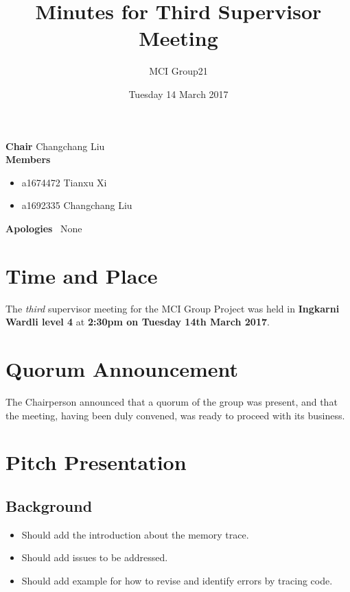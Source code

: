 \documentclass[11pt, a4paper]{article}
\begin{document}
\title{Minutes for Third Supervisor Meeting}
\author{MCI Group21}
\date{Tuesday 14 March 2017}
\maketitle

\vspace*{15pt}

\begin{center}
\begin{flushleft}
  \textbf{Chair}      \qquad Changchang Liu\\
  \textbf{Members}
  \begin {itemize}
  		\item a1674472 Tianxu Xi
		\item a1692335 Changchang Liu

  \end{itemize} 
  \textbf{Apologies}  \ None\\
\end{flushleft}
\end{center}




\vspace*{10pt}

\section{Time and Place}
The \emph{third} supervisor meeting for the MCI Group Project was held in \textbf{Ingkarni Wardli level 4} at \textbf{2:30pm on Tuesday 14th March 2017}.
 
\section{Quorum Announcement}
The Chairperson announced that a quorum of the group was present, and that the meeting, having been duly convened, was ready to proceed with its business.



\section{Pitch Presentation}

\subsection{Background}
\begin{itemize}
\item Should add the introduction about the memory trace.
\item Should add issues to be addressed.
\item Should add example for how to revise and identify errors by tracing code.
\end{itemize}
\end{document}
